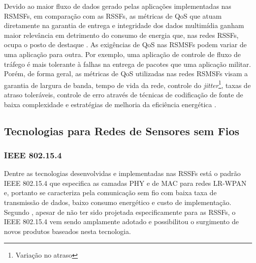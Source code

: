 
Devido ao maior fluxo de dados gerado pelas aplicações implementadas nas \ac{RSMSF}s, em comparação com as \ac{RSSF}s, as métricas de \ac{QoS} que atuam diretamente na garantia de entrega e integridade dos dados multimídia ganham maior relevância em detrimento do consumo de energia que, nas redes \ac{RSSF}s, ocupa o posto de destaque \cite{Zara,Akyildiz}. As exigências de \ac{QoS} nas \ac{RSMSF}s podem variar de uma aplicação para outra. Por exemplo, uma aplicação de controle de fluxo de tráfego é mais tolerante à falhas na entrega de pacotes que uma aplicação militar. Porém, de forma geral, as métricas de \ac{QoS} utilizadas nas redes \ac{RSMSF}s visam a garantia de largura de banda, tempo de vida da rede, controle do \textit{jitter}\footnote{Variação no atraso}, taxas de atraso toleráveis, controle de erro através de técnicas de codificação de fonte de baixa complexidade e estratégias de melhoria da eficiência energética \cite{Zara}.


\subsection{Tecnologias para Redes de Sensores sem Fios}
\label{s_c2_tech}
\subsubsection{IEEE 802.15.4}
Dentre as tecnologias desenvolvidas e implementadas nas \ac{RSSF}s está o padrão IEEE 802.15.4 que
especifica as camadas \ac{PHY} e de \ac{MAC} para redes \ac{LR-WPAN} e, portanto se caracteriza pela comunicação sem fio com baixa taxa de transmissão de dados, baixo consumo energético e custo de implementação. Segundo , apesar de não ter sido projetada especificamente para as \ac{RSSF}s, o IEEE 802.15.4 vem sendo amplamente adotado e possibilitou o surgimento de novos produtos baseados nesta tecnologia. 

